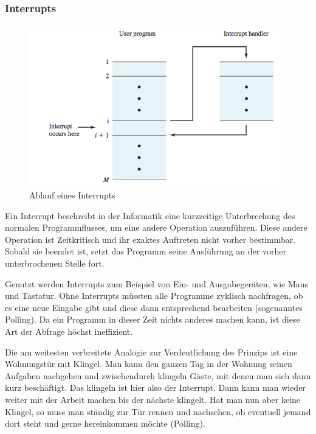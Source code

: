 \documentclass[12pt,a4paper]{scrartcl}
\begin{document}
\subsubsection{Interrupts}

\begin{figure}[H]
\centering
\includegraphics[scale=1.4]{interrupt.png}
\caption{Ablauf eines Interrupts \citep{Stallings:2000uq}}
\label{interrupt}
\end{figure}

Ein Interrupt beschreibt in der Informatik eine kurzzeitige Unterbrechung des normalen Programmflusses, um eine andere Operation auszuführen. Diese andere Operation ist Zeitkritisch und ihr exaktes Auftreten nicht vorher bestimmbar. Sobald sie beendet ist, setzt das Programm seine Ausführung an der vorher unterbrochenen Stelle fort.

Genutzt werden Interrupts zum Beispiel von Ein- und Ausgabegeräten, wie Maus und Tastatur. Ohne Interrupts müssten alle Programme zyklisch nachfragen, ob es eine neue Eingabe gibt und diese dann entsprechend bearbeiten (sogenanntes Polling). Da ein Programm in dieser Zeit nichts anderes machen kann, ist diese Art der Abfrage höchst ineffizient.

Die am weitesten verbreitete Analogie zur Verdeutlichung des Prinzips ist eine Wohnungstür mit Klingel. Man kann den ganzen Tag in der Wohnung seinen Aufgaben nachgehen und zwischendurch klingeln Gäste, mit denen man sich dann kurz beschäftigt. Das klingeln ist hier also der Interrupt. Dann kann man wieder weiter mit der Arbeit machen bis der nächste klingelt. Hat man nun aber keine Klingel, so muss man ständig zur Tür rennen und nachsehen, ob eventuell jemand dort steht und gerne hereinkommen möchte (Polling).
\end{document}
